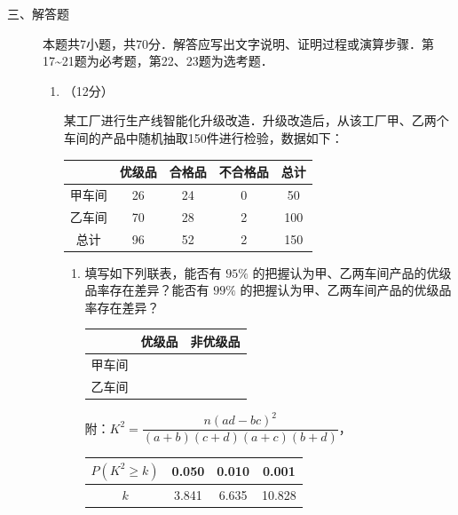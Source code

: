 \begin{description}
    \item[三、解答题] 本题共7小题，共70分．解答应写出文字说明、证明过程或演算步骤．第17\textasciitilde21题为必考题，第22、23题为选考题．
    \begin{enumerate}[leftmargin=5pt]
      \addtocounter{enumi}{+16}
        \item （12分）

        某工厂进行生产线智能化升级改造．升级改造后，从该工厂甲、乙两个车间的产品中随机抽取150件进行检验，数据如下：

        {\centering\begin{tabular}{c|c|c|c|c}
        \hline
        & 优级品 & 合格品 & 不合格品 & 总计 \\
        \hline
        甲车间 & 26 & 24 & 0 & 50 \\
        \hline
        乙车间 & 70 & 28 & 2 & 100 \\
        \hline
        总计 & 96 & 52 & 2 & 150 \\
        \hline
        \end{tabular}\par}

        \begin{enumerate}[label=(\arabic*)]
            \item 填写如下列联表，能否有 $95\%$ 的把握认为甲、乙两车间产品的优级品率存在差异？能否有 $99\%$ 的把握认为甲、乙两车间产品的优级品率存在差异？

            {\centering\begin{tabular}{c|c|c}
            \hline
            & 优级品 & 非优级品 \\
            \hline
            甲车间 & & \\
            \hline
            乙车间 & & \\
            \hline
            \end{tabular}\par}

            附：$K^2=\dfrac{n(ad-bc)^2}{(a+b)(c+d)(a+c)(b+d)}$，
            {\begin{tabular}{c|ccc}
            \hline
            $P(K^2\geqslant k)$ & 0.050 & 0.010 & 0.001 \\
            \hline
            $k$ & 3.841 & 6.635 & 10.828 \\
            \hline
            \end{tabular}\par}


\end{enumerate}
\end{enumerate}
\end{description}
